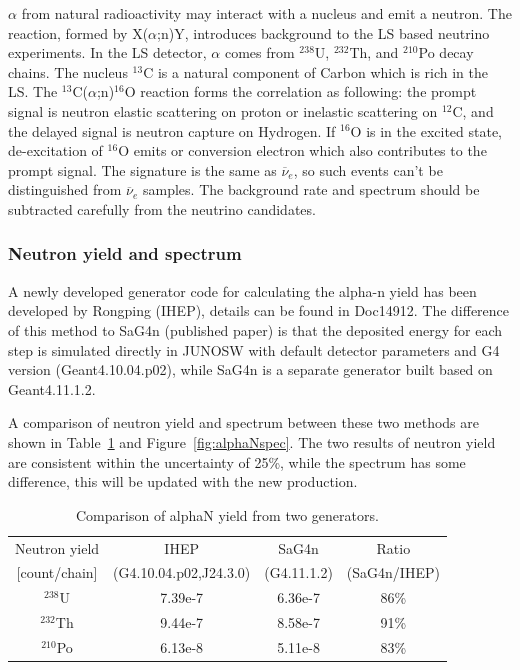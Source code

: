 $\alpha$ from natural radioactivity may interact with a nucleus and emit a neutron. The reaction, formed by X($\alpha$;n)Y, introduces background to the LS based neutrino experiments. In the LS detector, $\alpha$ comes from $^{238}$U, $^{232}$Th, and $^{210}$Po decay chains. The nucleus $^{13}$C is a natural component of Carbon which is rich in the LS. The $^{13}$C($\alpha$;n)$^{16}$O reaction
forms the correlation as following: the prompt signal is neutron elastic scattering on proton or inelastic scattering on $^{12}$C, and the delayed signal is neutron capture on Hydrogen. If $^{16}$O is in the excited state, de-excitation of $^{16}$O emits  or conversion electron which also contributes to the prompt signal. The signature is the same as $\overline{\nu}_e$, so such events can't be distinguished from $\overline{\nu}_e$ samples. The background rate and spectrum should be subtracted carefully from the neutrino candidates.

\subsubsection{Neutron yield and spectrum}
A newly developed generator code for calculating the alpha-n yield has been developed by Rongping (IHEP), details can be found in Doc14912. The difference of this method to SaG4n (published paper) is that the deposited energy for each step is simulated directly in JUNOSW with default detector parameters and G4 version (Geant4.10.04.p02), while SaG4n is a separate generator built based on Geant4.11.1.2.

A comparison of neutron yield and spectrum between these two methods are shown in Table~\ref{tab:alphaNyield} and Figure~\ref{fig:alphaNspec}. The two results of neutron yield are consistent within the uncertainty of 25\%, while the spectrum has some difference, this will be updated with the new production.

\begin{table}[!htbp]
    \caption{Comparison of alphaN yield from two generators.}
    \label{tab:alphaNyield}
    \centering
    \footnotesize%
    \setlength{\tabcolsep}{4pt}%
    \renewcommand{\arraystretch}{1.2}%
    \begin{tabular}{c|c|c|c}
        \hline
        Neutron yield & IHEP & SaG4n & Ratio  \\
        
        [count/chain] & (G4.10.04.p02,J24.3.0) & (G4.11.1.2) & (SaG4n/IHEP) \\ \hline
        $^{238}$U & 7.39e-7 & 6.36e-7 & 86\% \\
        $^{232}$Th & 9.44e-7 & 8.58e-7 & 91\% \\
        $^{210}$Po & 6.13e-8 & 5.11e-8 & 83\% \\
        \hline 
    \end{tabular}
\end{table}

